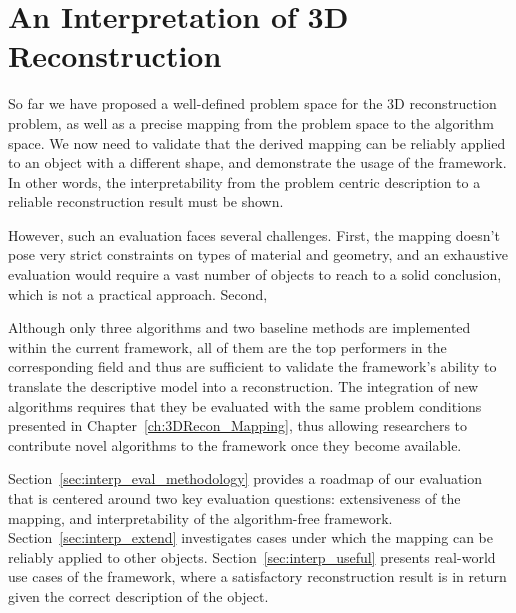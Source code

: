 
\chapter{An Interpretation of 3D Reconstruction}
\label{ch:3DRecon_Interp}
So far we have proposed a well-defined problem space for the 3D reconstruction problem, as well as a precise mapping from the problem space to the algorithm space. We now need to validate that the derived mapping can be reliably applied to an object with a different shape, and demonstrate the usage of the framework. In other words, the interpretability from the problem centric description to a reliable reconstruction result must be shown.

However, such an evaluation faces several challenges. First, the mapping doesn't pose very strict constraints on types of material and geometry, and an exhaustive evaluation would require a vast number of objects to reach to a solid conclusion, which is not a practical approach. Second, 


Although only three algorithms and two baseline methods are implemented within the current framework, all of them are the top performers in the corresponding field and thus are sufficient to validate the framework's ability to translate the descriptive model into a reconstruction. The integration of new algorithms requires that they be evaluated with the same problem conditions presented in Chapter~\ref{ch:3DRecon_Mapping}, thus allowing researchers to contribute novel algorithms to the framework once they become available.

Section~\ref{sec:interp_eval_methodology} provides a roadmap of our evaluation that is centered around two key evaluation questions: extensiveness of the mapping, and interpretability of the algorithm-free framework. Section~\ref{sec:interp_extend} investigates cases under which the mapping can be reliably applied to other objects. Section~\ref{sec:interp_useful} presents real-world use cases of the framework, where a satisfactory reconstruction result is in return given the correct description of the object.

